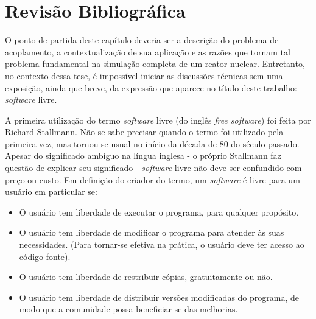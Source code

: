\chapter*[Revisão Bibliográfica]{Revisão Bibliográfica}
\label{chap:rev}



O ponto de partida deste capítulo deveria ser a descrição do problema de acoplamento,
a contextualização de sua aplicação e as razões que tornam tal problema fundamental
na simulação completa de um reator nuclear. Entretanto, no contexto dessa tese, é impossível
iniciar as discussões técnicas sem uma exposição, ainda que breve, da expressão que
aparece no título deste trabalho: \textit{software} livre.

A primeira utilização do termo \textit{software} livre (do inglês \textit{free software})
foi feita por Richard Stallmann. Não se sabe precisar quando o termo foi utilizado pela
primeira vez, mas tornou-se usual no início da década de 80 do século passado.
Apesar do significado ambíguo na língua inglesa - o próprio Stallmann faz questão
de explicar seu significado \cite{Stallman2002} - \textit{software} livre não deve
ser confundido com preço ou custo. Em definição do criador do termo, um \textit{software}
é livre para um usuário em particular se:
\begin{itemize}
\item O usuário tem liberdade de executar o programa, para qualquer propósito.
\item O usuário tem liberdade de modificar o programa para atender às suas necessidades.
  (Para tornar-se efetiva na prática, o usuário deve ter acesso ao código-fonte).
\item O usuário tem liberdade de restribuir cópias, gratuitamente ou não.
\item O usuário tem liberdade de distribuir versões modificadas do programa, de modo
  que a comunidade possa beneficiar-se das melhorias.
\end{itemize}

